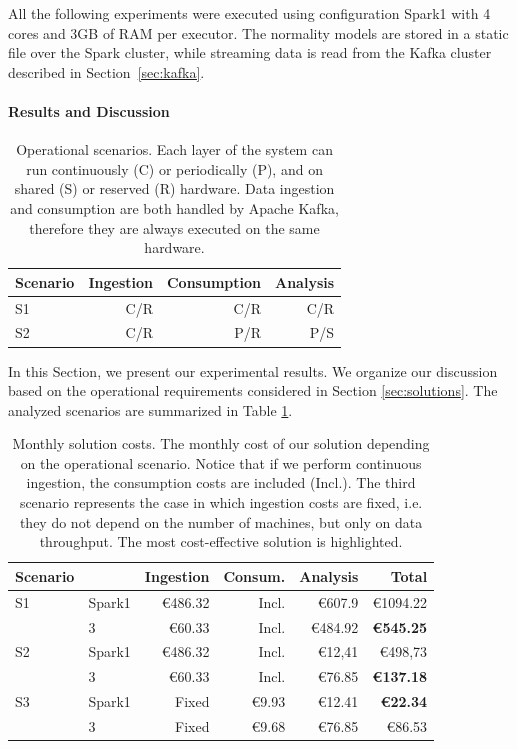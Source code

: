 {All the following experiments were executed using configuration Spark1 with 4 cores and 3GB of RAM per executor. The normality models are stored in a static file over the Spark cluster, while streaming data is read from the Kafka cluster described in Section~\ref{sec:kafka}.

\paragraph{Results and Discussion}
\label{sec:results}

\begin{table}[ht]
\centering
\caption{Operational scenarios. Each layer of the system can run continuously (C) or periodically (P), and on shared (S) or reserved (R) hardware. Data ingestion and consumption are both handled by Apache Kafka, therefore they are always executed on the same hardware.}
\begin{tabular}{@{}lrrr@{}} \toprule
Scenario & Ingestion & Consumption & Analysis \\
\midrule
S1 & C/R & C/R & C/R \\
S2 & C/R & P/R & P/S \\
\bottomrule
\end{tabular}
\label{tab:scenarios}
\end{table}

In this Section, we present our experimental results. We organize our discussion based on the operational requirements considered in Section \ref{sec:solutions}. The analyzed scenarios are summarized in Table \ref{tab:scenarios}. 

\begin{table}[ht]
\centering
\caption{Monthly solution costs. The monthly cost of our solution depending on the operational scenario. Notice that if we perform continuous ingestion, the consumption costs are included (Incl.). The third scenario represents the case in which ingestion costs are fixed, i.e. they do not depend on the number of machines, but only on data throughput. The most cost-effective solution is highlighted.}
\begin{tabular}{@{}llrrrr@{}} \toprule
Scenario & & Ingestion & Consum. & Analysis & Total\\
\midrule
S1 & Spark1 & \euro486.32 & Incl. & \euro607.9 & \euro1094.22 \\
   & \sti{}3 & \euro60.33 & Incl. & \euro484.92 & \textbf{\euro545.25}\\
\midrule
S2 & Spark1 & \euro486.32 & Incl. & \euro12,41 & \euro498,73\\
   & \sti{}3 & \euro60.33 & Incl. & \euro76.85 & \textbf{\euro137.18}\\
\midrule
S3 & Spark1 & Fixed & \euro9.93 & \euro12.41 & \textbf{\euro22.34}\\
   & \sti{}3 & Fixed & \euro9.68 & \euro76.85 & \euro86.53\\
\bottomrule
\end{tabular}
\label{tab:monthly}
\end{table}

}

